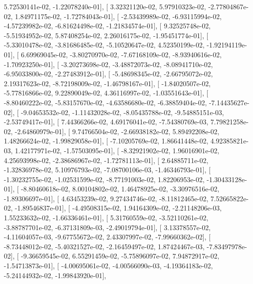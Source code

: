 \documentclass{article}
\begin{document}
          5.72530141e-02,  -1.22078240e-01],
       [  3.32321120e-02,   5.97910323e-02,  -2.77804867e-02,
          1.84971175e-02,  -1.72784043e-01],
       [ -2.53439989e-02,  -6.93115994e-02,  -4.57239982e-02,
         -6.81624498e-02,  -1.21834574e-01],
       [  9.32525748e-02,  -5.51934952e-02,   5.87408254e-02,
          2.26016175e-02,  -1.95451774e-01],
       [ -5.33010478e-02,  -3.81686485e-02,  -5.10520647e-02,
          4.52350199e-02,  -1.92194119e-01],
       [  6.69969045e-02,  -3.80270970e-02,  -7.67168109e-02,
         -8.93940616e-02,  -1.70923250e-01],
       [ -3.20273698e-02,  -3.48872073e-02,  -8.08941710e-02,
         -6.95033800e-02,  -2.27483912e-01],
       [ -5.48698345e-02,  -2.66795072e-02,   2.19317623e-02,
         -8.72198009e-02,  -1.46798167e-01],
       [ -1.84020507e-02,  -5.77816866e-02,   9.22890049e-02,
          4.36116997e-02,  -1.03551643e-01],
       [ -8.80460222e-02,  -5.83157670e-02,  -4.63586680e-02,
         -6.38859404e-02,  -7.14435627e-02],
       [ -9.04653532e-02,  -1.11432028e-02,  -8.05435788e-02,
         -9.54885151e-03,  -2.53749417e-01],
       [  7.44366266e-02,   4.69176041e-02,  -7.54380769e-03,
          7.79821258e-02,  -2.64860979e-01],
       [  9.74766504e-02,  -2.66938182e-02,   5.89492208e-02,
          1.48266624e-02,  -1.99829058e-01],
       [ -7.10205769e-02,   1.86641448e-02,   4.92385821e-03,
          1.42177971e-02,  -1.57503095e-01],
       [ -8.32921902e-02,   1.96016901e-02,   4.25693998e-02,
         -2.38686967e-02,  -1.72781113e-01],
       [  2.64885711e-02,  -1.32836978e-02,   5.10976793e-02,
         -7.08700106e-03,  -1.46346793e-01],
       [ -1.30232755e-02,  -1.02531599e-02,  -8.77191003e-02,
          1.82206953e-02,  -1.30433128e-01],
       [ -8.80460618e-02,   8.00104802e-02,   1.46478925e-02,
         -3.30976516e-02,  -1.89306697e-01],
       [  4.63453239e-02,   9.27434746e-02,  -8.11812465e-02,
          7.52665822e-02,  -1.89546837e-01],
       [ -4.49508315e-02,   1.94164309e-02,  -2.21148206e-03,
          1.55233632e-02,  -1.66336461e-01],
       [  5.31760559e-02,  -3.52110261e-02,  -3.88787701e-02,
         -6.37131809e-03,  -2.49019794e-01],
       [  3.13378557e-02,  -4.11604057e-03,  -9.67755672e-02,
          2.43307997e-02,  -7.99660362e-02],
       [ -8.73448012e-02,  -5.40321527e-02,  -2.16459497e-02,
          1.87424467e-03,  -7.83497978e-02],
       [ -9.36659545e-02,   6.55291459e-02,  -5.75896097e-02,
          7.94872917e-02,  -1.54713873e-01],
       [ -4.00695061e-02,  -4.00566090e-03,  -4.19364183e-02,
         -5.24144932e-02,  -1.99843920e-01],
\end{document}
